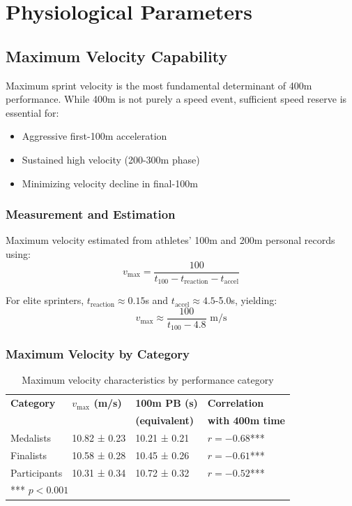 \section{Physiological Parameters}

\subsection{Maximum Velocity Capability}

Maximum sprint velocity is the most fundamental determinant of 400m performance. While 400m is not purely a speed event, sufficient speed reserve is essential for:
\begin{itemize}
    \item Aggressive first-100m acceleration
    \item Sustained high velocity (200-300m phase)
    \item Minimizing velocity decline in final-100m
\end{itemize}

\subsubsection{Measurement and Estimation}

Maximum velocity estimated from athletes' 100m and 200m personal records using:
\begin{equation}
v_{\max} = \frac{100}{t_{100} - t_{\text{reaction}} - t_{\text{accel}}}
\end{equation}

For elite sprinters, $t_{\text{reaction}} \approx 0.15$s and $t_{\text{accel}} \approx 4.5$-5.0s, yielding:
\begin{equation}
v_{\max} \approx \frac{100}{t_{100} - 4.8} \text{ m/s}
\end{equation}

\subsubsection{Maximum Velocity by Category}

\begin{table}[H]
\centering
\caption{Maximum velocity characteristics by performance category}
\begin{tabular}{@{}llll@{}}
\toprule
\textbf{Category} & \textbf{$v_{\max}$ (m/s)} & \textbf{100m PB (s)} & \textbf{Correlation} \\
 & & \textbf{(equivalent)} & \textbf{with 400m time} \\
\midrule
Medalists & 10.82 ± 0.23 & 10.21 ± 0.21 & $r = -0.68$*** \\
Finalists & 10.58 ± 0.28 & 10.45 ± 0.26 & $r = -0.61$*** \\
Participants & 10.31 ± 0.34 & 10.72 ± 0.32 & $r = -0.52$*** \\
\bottomrule
\multicolumn{4}{l}{\small{*** $p < 0.001$}}
\end{tabular}
\end{table}

